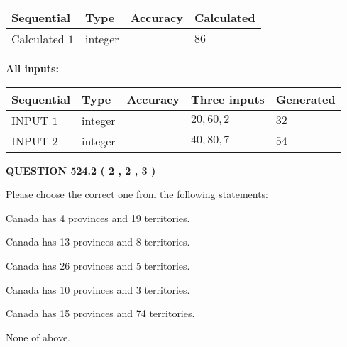 \documentclass[12pt]{article}
\begin{document}
   
   
   
\noindent{}
   
   
  
  
\noindent\begin{tabular}{|l|l|l|l|}
\hline
 Sequential & Type & Accuracy & Calculated \\ 
\hline
 
 
  Calculated $  1 $ & integer &  & 
  $ 86 $ 
 \\  \hline  
 \end{tabular}
   
   
   
   
\noindent\vspace{0.1in}\hspace{-0.08in} {\textbf{\Large{All inputs: }}}
   
   
  
  
\noindent\begin{tabular}{|l|l|l|l|l|}
\hline
 Sequential & Type & Accuracy & Three inputs & Generated \\ 
\hline
 
 
  INPUT $  1 $ & integer &  & $
 20
 , 
 60
 , 
 2
 $ & $ 32 $ 
 \\  \hline  
 
 
  INPUT $  2 $ & integer &  & $
 40
 , 
 80
 , 
 7
 $ & $ 54 $ 
 \\  \hline  
 \end{tabular}
   
   
  
\vspace{0.2in}
  
{\textbf{\Large{QUESTION
524.2 
 ( 2 , 2 , 3 )
}}}
  
  
Please choose the correct one from the following statements:
 
 
Canada has   4 provinces and  19 territories.
 
 
Canada has  13 provinces and  8 territories.
 
 
Canada has  26 provinces and  5 territories.
 
 
Canada has 10  provinces and 3 territories.
 
 
Canada has  15 provinces and  74 territories.
 
 
 None of above.
 
\end{document}
